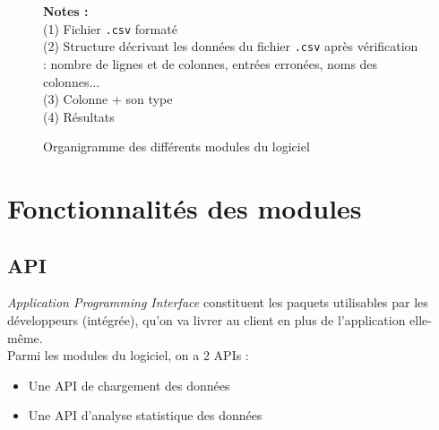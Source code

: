 		\begin{center}\begin{figure}[h]
			\textbf{Notes :}\\
			(1) Fichier \lstinline!.csv! formaté \\
			(2) Structure décrivant les données du fichier \lstinline!.csv! après vérification : nombre de lignes et de colonnes, entrées erronées, noms des colonnes...\\
			(3) Colonne + son type\\
			(4) Résultats
			\caption{Organigramme des différents modules du logiciel}\label{fig:M1}
		\end{figure}\end{center}
	
	\section{Fonctionnalités des modules}
		\subsection{API}
			\textit{Application Programming Interface} constituent les paquets utilisables par les développeurs (intégrée), qu'on va livrer au client en plus de l'application elle-même.\\
			Parmi les modules du logiciel, on a 2 APIs :
			\begin{itemize}
				\item Une API de chargement des données
				\item Une API d'analyse statistique des données
			\end{itemize}
		
